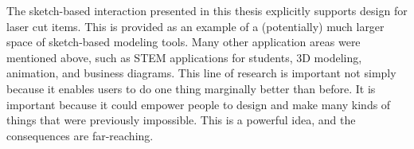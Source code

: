The sketch-based interaction presented in this thesis explicitly
supports design for laser cut items. This is provided as an example of
a (potentially) much larger space of sketch-based modeling tools. Many
other application areas were mentioned above, such as STEM
applications for students, 3D modeling, animation, and business
diagrams. This line of research is important not simply because it
enables users to do one thing marginally better than before. It is
important because it could empower people to design and make many
kinds of things that were previously impossible. This is a powerful
idea, and the consequences are far-reaching. 

